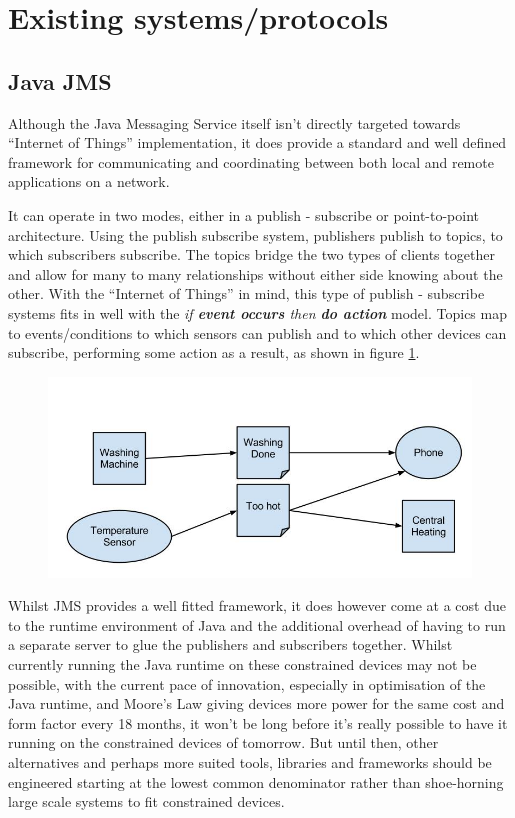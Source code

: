 
\section{Existing systems/protocols} %
\label{sec:existing_systems_protocols}

\subsection{Java JMS} %
\label{sub:java_jms}
Although the Java Messaging Service itself isn't directly targeted towards ``Internet of Things'' implementation, it does provide a standard and well defined framework for communicating and coordinating between both local and remote applications on a network. 

It can operate in two modes, either in a publish - subscribe or point-to-point architecture. Using the publish subscribe system, publishers publish to topics, to which subscribers subscribe. The topics bridge the two types of clients together and allow for many to many relationships without either side knowing about the other. With the ``Internet of Things'' in mind, this type of publish - subscribe systems fits in well with the \textit{if \textbf{event occurs} then \textbf{do action}} model. Topics map to events/conditions to which sensors can publish and to which other devices can subscribe, performing some action as a result, as shown in figure \ref{fig:JMS}.

\begin{figure}[h!]
	\centering
		\includegraphics[scale=0.4]{images/JMS-IoT.jpg}
		\label{fig:JMS}
\end{figure}


Whilst JMS provides a well fitted framework, it does however come at a cost due to the runtime environment of Java and the additional overhead of having to run a separate server to glue the publishers and subscribers together. Whilst currently running the Java runtime on these constrained devices may not be possible, with the current pace of innovation, especially in optimisation of the Java runtime, and Moore's Law giving devices more power for the same cost and form factor every 18 months, it won't be long before it's really possible to have it running on the constrained devices of tomorrow. But until then, other alternatives and perhaps more suited tools, libraries and frameworks should be engineered starting at the lowest common denominator rather than shoe-horning large scale systems to fit constrained devices.


